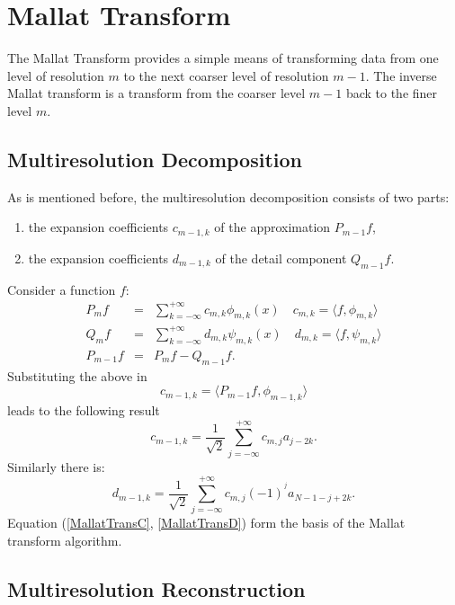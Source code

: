 \documentclass{book}
\newcommand{\nospace}{}
\newenvironment{enumeratenumeric}{\begin{enumerate}[1.] }{\end{enumerate}}
\begin{document}
\section{Mallat Transform}

The Mallat Transform provides a simple means of transforming data from one
level of resolution $m$ to the next coarser level of resolution $m - 1$. The
inverse Mallat transform is a transform from the coarser level $m - 1$ back to
the finer level $m$.

\subsection{Multiresolution Decomposition}

As is mentioned before, the multiresolution decomposition consists of two
parts:
\begin{enumeratenumeric}
  \item the expansion coefficients $c_{m - 1, k}$ of the approximation $P_{m -
  1} f$,
  
  \item the expansion coefficients $d_{m - 1, k}$ of the detail component
  $Q_{m - 1} f.$
\end{enumeratenumeric}
Consider a function $f$:
\begin{eqnarray*}
  P_m f & = & \sum_{k = - \infty}^{+ \infty} c_{m, k} \phi_{m, k} (x) \quad
  c_{m, k} = \langle f, \nospace \phi_{m, k} \rangle\\
  Q_m f & = & \sum_{k = - \infty}^{+ \infty} d_{m, k} \psi_{m, k} (x) \quad
  d_{m, k} = \langle f, \psi_{m, k} \rangle\\
  P_{m - 1} f & = & P_m f - Q_{m - 1} f.
\end{eqnarray*}
Substituting the above in
\[ c_{m - 1, k} = \langle P_{m - 1} f, \phi_{m - 1, k} \rangle \]
leads to the following result
\begin{equation}
  c_{m - 1, k} = \frac{1}{\sqrt{2}} \sum_{j = - \infty}^{+ \infty} c_{m, j}
  a_{j - 2 k} \label{MallatTransC} .
\end{equation}
\[ \  \]
Similarly there is:
\begin{equation}
  d_{m - 1, k} = \frac{1}{\sqrt{2}} \sum_{j = - \infty}^{+ \infty} c_{m, j} (-
  1)^{^j} a_{N - 1 - j + 2 k} \label{MallatTransD} .
\end{equation}
Equation (\ref{MallatTransC}, \ref{MallatTransD}) form the basis of the Mallat
transform algorithm.

\subsection{Multiresolution Reconstruction}
\end{document}
